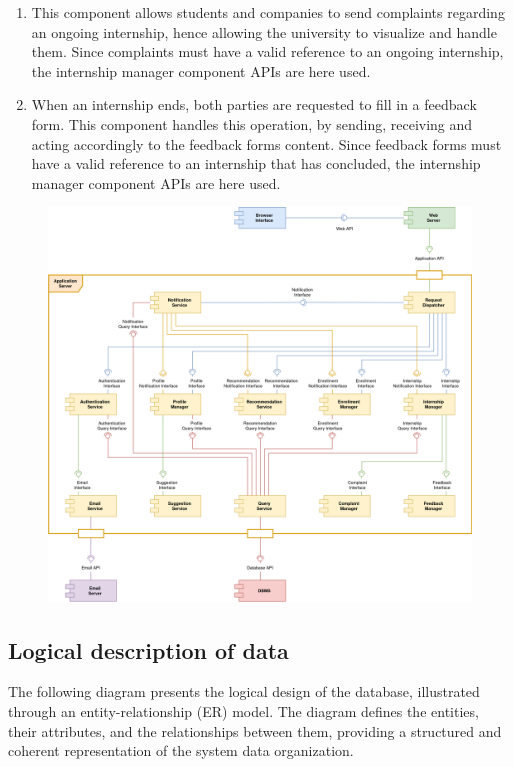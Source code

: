 \begin{enumerate}[label=\textbf{C\arabic* -}]
\item {}
This component allows students and companies to send complaints regarding an ongoing internship, hence allowing the university to visualize and handle them.
Since complaints must have a valid reference to an ongoing internship, the internship manager component APIs are here used.

\item {}
When an internship ends, both parties are requested to fill in a feedback form.
This component handles this operation, by sending, receiving and acting accordingly to the feedback forms content.
Since feedback forms must have a valid reference to an internship that has concluded, the internship manager component APIs are here used.

\end{enumerate}

\begin{figure}[H]
    \centering
    \includegraphics[width=0.8\linewidth]{../../assets/components-diagrams/components-diagram.png}
\end{figure}

\subsection{Logical description of data}

The following diagram presents the logical design of the database, illustrated through an entity-relationship (ER) model.
The diagram defines the entities, their attributes, and the relationships between them, providing a structured and coherent representation of the system data organization.

